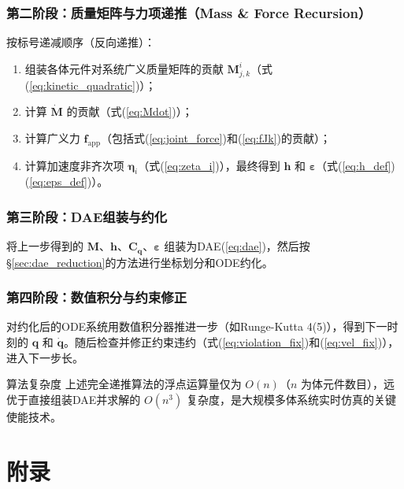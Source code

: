\documentclass[10pt,a4paper]{book}
\theoremstyle{thmstyle}
\theoremstyle{defstyle}
\theoremstyle{prostyle}
\renewcommand{\vec}[1]{\bm{#1}}
\newcommand{\mat}[1]{\bm{#1}}
\begin{document}
\subsection*{第二阶段：质量矩阵与力项递推（Mass \& Force Recursion）}

按标号递减顺序（反向递推）：
\begin{enumerate}
    \item 组装各体元件对系统广义质量矩阵的贡献 $\mat{M}_{j,k}^{i}$（式(\ref{eq:kinetic_quadratic})）；
    \item 计算 $\dot{\mat{M}}$ 的贡献（式(\ref{eq:Mdot})）；
    \item 计算广义力 $\vec{f}_{\mathrm{app}}$（包括式(\ref{eq:joint_force})和(\ref{eq:fJk})的贡献）；
    \item 计算加速度非齐次项 $\vec{\eta}_i$（式(\ref{eq:zeta_i})），最终得到 $\vec{h}$ 和 $\vec{\varepsilon}$（式(\ref{eq:h_def})(\ref{eq:eps_def})）。
\end{enumerate}

\subsection*{第三阶段：DAE组装与约化}

将上一步得到的 $\mat{M}$、$\vec{h}$、$\mat{C}_{\vec{q}}$、$\vec{\varepsilon}$ 组装为DAE(\ref{eq:dae})，然后按\S\ref{sec:dae_reduction}的方法进行坐标划分和ODE约化。

\subsection*{第四阶段：数值积分与约束修正}

对约化后的ODE系统用数值积分器推进一步（如Runge-Kutta 4(5)），得到下一时刻的 $\vec{q}$ 和 $\dot{\vec{q}}$。随后检查并修正约束违约（式(\ref{eq:violation_fix})和(\ref{eq:vel_fix})），进入下一步长。

\begin{myTheorem}{算法复杂度}
上述完全递推算法的浮点运算量仅为 $O(n)$（$n$ 为体元件数目），远优于直接组装DAE并求解的 $O(n^3)$ 复杂度，是大规模多体系统实时仿真的关键使能技术。
\end{myTheorem}


\appendix
\chapter{附录}
\end{document}
